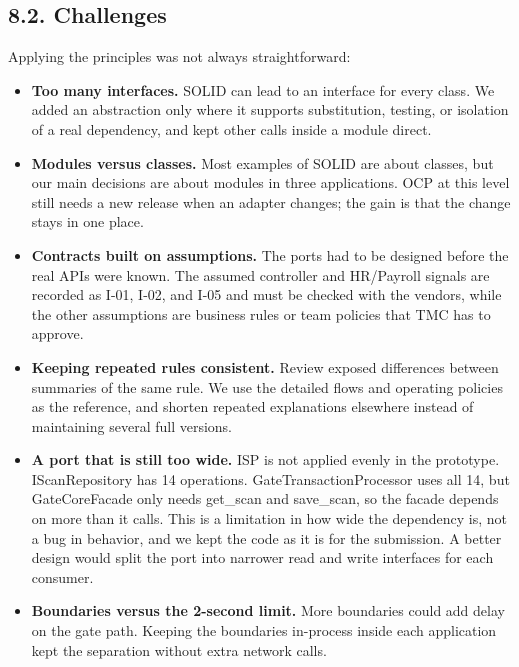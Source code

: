 \subsection*{8.2. Challenges}

{}


Applying the principles was not always straightforward:

\begin{itemize}[leftmargin=36pt, itemsep=2pt, topsep=4pt, parsep=2pt]
  \item \textbf{Too many interfaces.} SOLID can lead to an interface for every class. We added an abstraction only where it supports substitution, testing, or isolation of a real dependency, and kept other calls inside a module direct.
  \item \textbf{Modules versus classes.} Most examples of SOLID are about classes, but our main decisions are about modules in three applications. OCP at this level still needs a new release when an adapter changes; the gain is that the change stays in one place.
  \item \textbf{Contracts built on assumptions.} The ports had to be designed before the real APIs were known. The assumed controller and HR/Payroll signals are recorded as I-01, I-02, and I-05 and must be checked with the vendors, while the other assumptions are business rules or team policies that TMC has to approve.
  \item \textbf{Keeping repeated rules consistent.} Review exposed differences between summaries of the same rule. We use the detailed flows and operating policies as the reference, and shorten repeated explanations elsewhere instead of maintaining several full versions.
  \item \textbf{A port that is still too wide.} ISP is not applied evenly in the prototype. IScanRepository has 14 operations. GateTransactionProcessor uses all 14, but GateCoreFacade only needs get\_scan and save\_scan, so the facade depends on more than it calls. This is a limitation in how wide the dependency is, not a bug in behavior, and we kept the code as it is for the submission. A better design would split the port into narrower read and write interfaces for each consumer.
  \item \textbf{Boundaries versus the 2-second limit.} More boundaries could add delay on the gate path. Keeping the boundaries in-process inside each application kept the separation without extra network calls.
\end{itemize}

